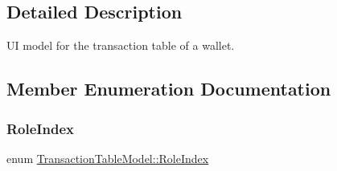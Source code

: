 \subsection{Detailed Description}
UI model for the transaction table of a wallet. 

\subsection{Member Enumeration Documentation}
\mbox{\label{class_transaction_table_model_a4b248508c36df598476affbf9871d1e6}} 
\subsubsection{\texorpdfstring{RoleIndex}{RoleIndex}}
{\footnotesize\ttfamily enum \mbox{\hyperlink{class_transaction_table_model_a4b248508c36df598476affbf9871d1e6}{Transaction\+Table\+Model\+::\+Role\+Index}}}

